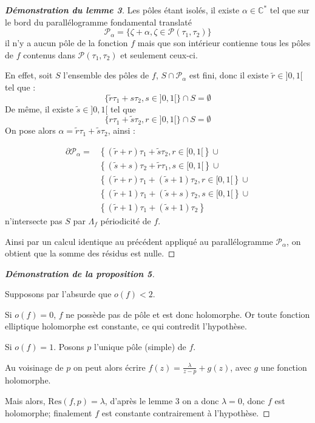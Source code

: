 \documentclass[12pt]{article}
\begin{document}
\begin{proof}[\textbf{Démonstration du lemme 3}]
    Les pôles étant isolés, il existe \( \alpha \in \mathbb{C}^* \) tel que sur le bord du parallélogramme fondamental translaté 
    \[
    \mathcal{P}_\alpha = \{ \zeta + \alpha, \zeta \in \mathcal{P}(\tau_1, \tau_2)\}
    \]
    il n’y a aucun pôle de la fonction \( f \) mais que son intérieur contienne tous les pôles de \( f \) contenus dans \( \mathcal{P}(\tau_1, \tau_2) \) et seulement ceux-ci.
    
    En effet, soit \( S \) l'ensemble des pôles de \( f \), \( S \cap \mathcal{P}_\alpha \) est fini, donc il existe \(  \tilde{r} \in ]0, 1[ \) tel que :
    \[
    \{\tilde{r}\tau_1 + s\tau_2, s \in ]0, 1[\} \cap S = \emptyset
    \]
    De même, il existe \( \tilde{s} \in ]0, 1[ \) tel que 
    \[
    \{r\tau_1 + \tilde{s}\tau_2, r \in ]0, 1[\} \cap S = \emptyset
    \]
    On pose alors \( \alpha = \tilde{r}\tau_1 + \tilde{s}\tau_2 \), ainsi :
    
    \begin{align*}
        \partial \mathcal{P}_\alpha = & \left\{ (\tilde{r}+r)\tau_1 + \tilde{s}\tau_2, r \in [0, 1[ \right\} \cup \\
                            & \left\{ (\tilde{s}+ s)\tau_2 + \tilde{r}\tau_1, s \in [0, 1[ \right\} \cup \\
                            & \left\{ (\tilde{r} + r)\tau_1 + (\tilde{s} + 1)\tau_2, r \in [0, 1[ \right\} \cup \\
                            & \left\{ (\tilde{r} + 1)\tau_1 + (\tilde{s} + s)\tau_2, s \in [0, 1[ \right\} \cup \\
                            & \left\{ (\tilde{r} + 1)\tau_1 + (\tilde{s} + 1)\tau_2 \right\}
    \end{align*}
    n'intersecte pas \( S \) par \( \Lambda_f \) périodicité de \( f \).
    
    Ainsi par un calcul identique au précédent appliqué au parallélogramme \( \mathcal{P}_\alpha \), on obtient que la somme des résidus est nulle.
    \end{proof}

    \begin{proof}[\textbf{Démonstration de la proposition 5}] \
        


Supposons par l'absurde que \( o(f) < 2 \).

Si \( o(f) = 0 \), \( f \) ne possède pas de pôle et est donc holomorphe. Or toute fonction elliptique holomorphe est constante, ce qui contredit l'hypothèse.

Si \( o(f) = 1 \). Posons \( p \) l'unique pôle (simple) de \( f \).

Au voisinage de \( p \) on peut alors écrire \( f(z) = \frac{\lambda}{z - p} + g(z) \), avec \( g \) une fonction holomorphe.

Mais alors, \( \text{Res}(f, p) = \lambda \), d'après le lemme 3 on a donc \( \lambda = 0 \), donc \( f \) est holomorphe; finalement \( f \) est constante contrairement à l'hypothèse.
\end{proof}
\end{document}
